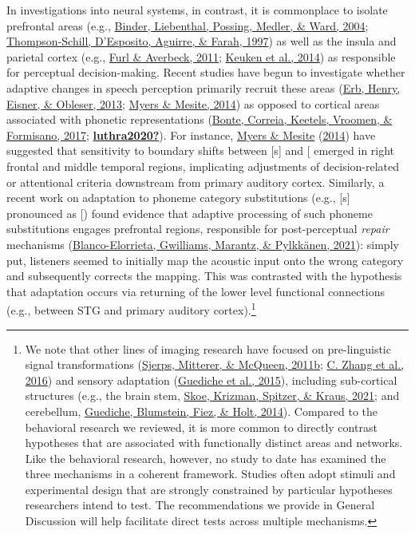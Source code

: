 \documentclass[
  11pt,
  english,
  man,floatsintext]{apa6}
\begin{document}
In investigations into neural systems, in contrast, it is commonplace to isolate prefrontal areas (e.g., \protect\hyperlink{ref-binder2004neural}{Binder, Liebenthal, Possing, Medler, \& Ward, 2004}; \protect\hyperlink{ref-thompson1997role}{Thompson-Schill, D'Esposito, Aguirre, \& Farah, 1997}) as well as the insula and parietal cortex (e.g., \protect\hyperlink{ref-furl2011parietal}{Furl \& Averbeck, 2011}; \protect\hyperlink{ref-keuken2014}{Keuken et al., 2014}) as responsible for perceptual decision-making. Recent studies have begun to investigate whether adaptive changes in speech perception primarily recruit these areas (\protect\hyperlink{ref-erb2013brain}{Erb, Henry, Eisner, \& Obleser, 2013}; \protect\hyperlink{ref-myers-mesite2014}{Myers \& Mesite, 2014}) as opposed to cortical areas associated with phonetic representations (\protect\hyperlink{ref-bonte2017}{Bonte, Correia, Keetels, Vroomen, \& Formisano, 2017}; \protect\hyperlink{ref-luthra2020}{\textbf{luthra2020?}}). For instance, \protect\hyperlink{ref-myers-mesite2014}{Myers \& Mesite} (\protect\hyperlink{ref-myers-mesite2014}{2014}) have suggested that sensitivity to boundary shifts between {[}s{]} and {[}\ipatext{ʃ}{]} emerged in right frontal and middle temporal regions, implicating adjustments of decision-related or attentional criteria downstream from primary auditory cortex. Similarly, a recent work on adaptation to phoneme category substitutions (e.g., {[}s{]} pronounced as {[}\ipatext{ʃ}{]}) found evidence that adaptive processing of such phoneme substitutions engages prefrontal regions, responsible for post-perceptual \emph{repair} mechanisms (\protect\hyperlink{ref-blanco-elorriera2021}{Blanco-Elorrieta, Gwilliams, Marantz, \& Pylkkänen, 2021}): simply put, listeners seemed to initially map the acoustic input onto the wrong category and subsequently corrects the mapping. This was contrasted with the hypothesis that adaptation occurs via returning of the lower level functional connections (e.g., between STG and primary auditory cortex).\footnote{We note that other lines of imaging research have focused on pre-linguistic signal transformations (\protect\hyperlink{ref-sjerps2011listening}{Sjerps, Mitterer, \& McQueen, 2011b}; \protect\hyperlink{ref-zhang2016functionally}{C. Zhang et al., 2016}) and sensory adaptation (\protect\hyperlink{ref-guediche2015evidence}{Guediche et al., 2015}), including sub-cortical structures (e.g., the brain stem, \protect\hyperlink{ref-skoe2021auditory}{Skoe, Krizman, Spitzer, \& Kraus, 2021}; and cerebellum, \protect\hyperlink{ref-guediche2014}{Guediche, Blumstein, Fiez, \& Holt, 2014}). Compared to the behavioral research we reviewed, it is more common to directly contrast hypotheses that are associated with functionally distinct areas and networks. Like the behavioral research, however, no study to date has examined the three mechanisms in a coherent framework. Studies often adopt stimuli and experimental design that are strongly constrained by particular hypotheses researchers intend to test. The recommendations we provide in General Discussion will help facilitate direct tests across multiple mechanisms.}
\end{document}
